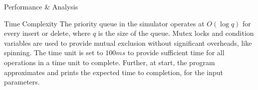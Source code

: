 \begin{section}{Performance \& Analysis}
    \begin{subsection}{Time Complexity}
        The priority queue in the simulator operates at $O(\log q)$ for every insert or delete, where $q$ is the size of the queue. Mutex locks and condition variables are used to provide mutual exclusion without significant overheads, like spinning. The time unit is set to $100ms$ to provide sufficient time for all operations in a time unit to complete. Further, at start, the program approximates and prints the expected time to completion, for the input parameters. 
    \end{subsection}
\end{section}

